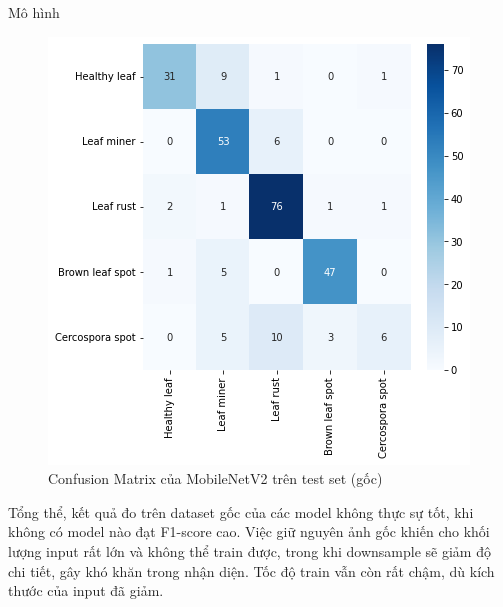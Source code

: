 \documentclass{beamer}
\begin{document}
\begin{frame}[allowframebreaks]{Mô hình}
	\begin{figure}[H]
		\centering
		\includegraphics[scale=0.4]{images/mobilenetv2_matrix.png}
		\caption{Confusion Matrix của MobileNetV2 trên test set (gốc)}
	\end{figure}

	Tổng thể, kết quả đo trên dataset gốc của các model không thực sự tốt, khi không có model nào đạt F1-score cao. Việc giữ nguyên ảnh gốc khiến cho khối lượng input rất lớn và không thể train được, trong khi downsample sẽ giảm độ chi tiết, gây khó khăn trong nhận diện. Tốc độ train vẫn còn rất chậm, dù kích thước của input đã giảm.

	\framebreak


\end{frame}
\end{document}
